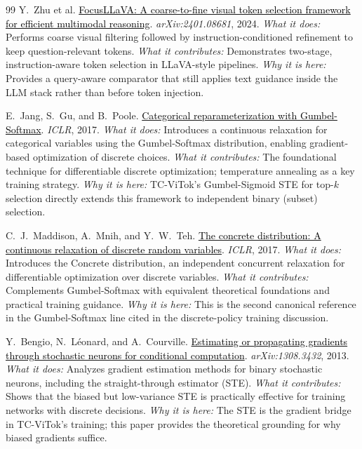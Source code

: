 \documentclass[11pt,twocolumn]{article}
\newcommand{\paperhref}[2]{\href{#1}{\textcolor{black}{#2}}}
\begin{document}
\begin{thebibliography}{99}
Y.~Zhu et al.
\newblock \paperhref{https://arxiv.org/abs/2401.08681}{FocusLLaVA: A coarse-to-fine visual token selection framework for efficient multimodal reasoning}.
\newblock \textit{arXiv:2401.08681}, 2024.
\newblock \textit{What it does:} Performs coarse visual filtering followed by instruction-conditioned refinement to keep question-relevant tokens.
\newblock \textit{What it contributes:} Demonstrates two-stage, instruction-aware token selection in LLaVA-style pipelines.
\newblock \textit{Why it is here:} Provides a query-aware comparator that still applies text guidance inside the LLM stack rather than before token injection.

E.~Jang, S.~Gu, and B.~Poole.
\newblock \paperhref{https://arxiv.org/abs/1611.01144}{Categorical reparameterization with Gumbel-Softmax}.
\newblock \textit{ICLR}, 2017.
\newblock \textit{What it does:} Introduces a continuous relaxation for categorical variables using the Gumbel-Softmax distribution, enabling gradient-based optimization of discrete choices.
\newblock \textit{What it contributes:} The foundational technique for differentiable discrete optimization; temperature annealing as a key training strategy.
\newblock \textit{Why it is here:} TC-ViTok's Gumbel-Sigmoid STE for top-$k$ selection directly extends this framework to independent binary (subset) selection.

C.~J.~Maddison, A.~Mnih, and Y.~W.~Teh.
\newblock \paperhref{https://arxiv.org/abs/1611.00712}{The concrete distribution: A continuous relaxation of discrete random variables}.
\newblock \textit{ICLR}, 2017.
\newblock \textit{What it does:} Introduces the Concrete distribution, an independent concurrent relaxation for differentiable optimization over discrete variables.
\newblock \textit{What it contributes:} Complements Gumbel-Softmax with equivalent theoretical foundations and practical training guidance.
\newblock \textit{Why it is here:} This is the second canonical reference in the Gumbel-Softmax line cited in the discrete-policy training discussion.

Y.~Bengio, N.~L\'{e}onard, and A.~Courville.
\newblock \paperhref{https://arxiv.org/abs/1308.3432}{Estimating or propagating gradients through stochastic neurons for conditional computation}.
\newblock \textit{arXiv:1308.3432}, 2013.
\newblock \textit{What it does:} Analyzes gradient estimation methods for binary stochastic neurons, including the straight-through estimator (STE).
\newblock \textit{What it contributes:} Shows that the biased but low-variance STE is practically effective for training networks with discrete decisions.
\newblock \textit{Why it is here:} The STE is the gradient bridge in TC-ViTok's training; this paper provides the theoretical grounding for why biased gradients suffice.


\end{thebibliography}
\end{document}
